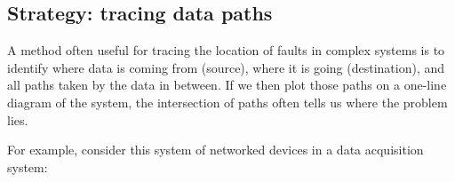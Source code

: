 











\filbreak
\subsection{Strategy: tracing data paths}

A method often useful for tracing the location of faults in complex systems is to identify where data is coming from (source), where it is going (destination), and all paths taken by the data in between.  If we then plot those paths on a one-line diagram of the system, the intersection of paths often tells us where the problem lies.

For example, consider this system of networked devices in a data acquisition system:

